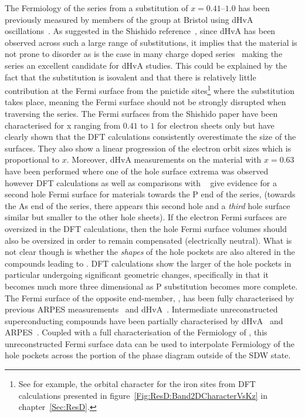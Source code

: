 The Fermiology of the \BaFeAsP{} series from a substitution of $x=0.41$--$1.0$ has been previously measured by members of the group at Bristol using dHvA oscillations~\cite{Shishido2010}. As suggested in the Shishido reference~\cite{Shishido2010}, since dHvA has been observed across such a large range of substitutions, it implies that the material is not prone to disorder as is the case in many charge doped series~\cite{VanderBeek2010} making the series an excellent candidate for dHvA studies. This could be explained by the fact that the substitution is isovalent and that there is relatively little contribution at the Fermi surface from the pnictide sites\footnote{See for example, the orbital character for the iron sites from \ac{DFT} calculations presented in figure~\ref{Fig:ResD:Band2DCharacterVsKz} in chapter~\ref{Sec:ResD}.} where the substitution takes place, meaning the Fermi surface should not be strongly disrupted when traversing the series. The Fermi surfaces from the Shishido paper have been characterised for x ranging from $0.41$ to $1$ for electron sheets only but have clearly shown that the DFT calculations consistently overestimate the size of the surfaces. They also show a linear progression of the electron orbit sizes which is proportional to $x$. Moreover, dHvA measurements on the material with $x=0.63$ have been performed where one of the hole surface extrema was observed~\cite{Analytis2010c} however DFT calculations as well as comparisons with \SrFeP~\cite{Analytis2009} give evidence for a second hole Fermi surface for materials towards the P end of the series, (towards the As end of the series, there appears this second hole and a \emph{third} hole surface similar but smaller to the other hole sheets). If the electron Fermi surfaces are oversized in the DFT calculations, then the hole Fermi surface volumes should also be oversized in order to remain compensated (electrically neutral). What is not clear though is whether the \emph{shapes} of the hole pockets are also altered in the compounds leading to \BaFeP. DFT calculations show the larger of the hole pockets in particular undergoing significant geometric changes, specifically in that it becomes much more three dimensional as P substitution becomes more complete. The Fermi surface of the opposite end-member, \BaFeAs, has been fully characterised by previous \ac{ARPES} measurements~\cite{Kondo2010a} and dHvA~\cite{Terashima2011, Analytis2010b}. Intermediate unreconstructed superconducting compounds have been partially characterised by \ac{dHvA}~\cite{Analytis2010c} and \ac{ARPES}~\cite{Yoshida2010}. Coupled with a full characterisation of the Fermiology of \BaFeP, this unreconstructed Fermi surface data can be used to interpolate Fermiology of the hole pockets across the portion of the phase diagram outside of the \ac{SDW} state.

